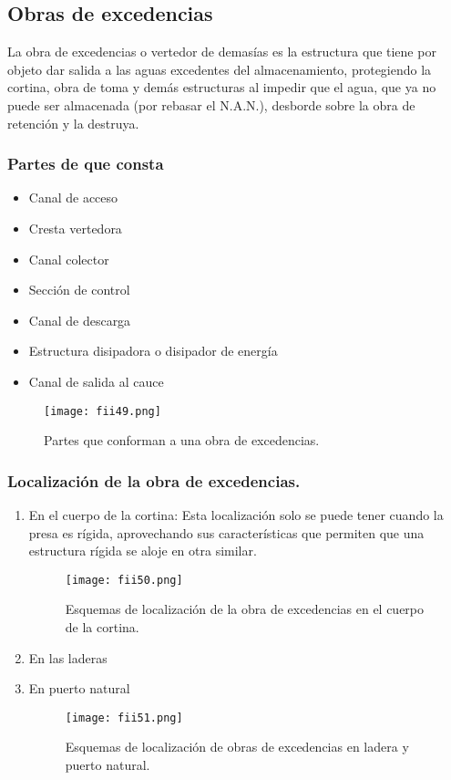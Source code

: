 \subsection{Obras de excedencias}

\begin{definition}
	La obra de excedencias o vertedor de demasías es la estructura que tiene por
	objeto dar salida a las aguas excedentes del almacenamiento, protegiendo la cortina,
	obra de toma y demás estructuras al impedir que el agua, que ya no puede ser
	almacenada (por rebasar el N.A.N.), desborde sobre la obra de retención y la destruya.
\end{definition}

\subsubsection{Partes de que consta}

\begin{itemize}
	\item Canal de acceso
	\item Cresta vertedora
	\item Canal colector
	\item Sección de control
	\item Canal de descarga
	\item Estructura disipadora o disipador de energía
	\item Canal de salida al cauce
\end{itemize}

\begin{figure}[h!]
	\centerline{\texttt{[image: fii49.png]}}
	\caption{Partes que conforman a una obra de excedencias.}
	\label{fii49}
\end{figure}

\subsubsection{Localización de la obra de excedencias.}

\begin{enumerate}[noitemsep]
	\item En el cuerpo de la cortina: Esta localización solo se puede tener cuando la presa es rígida, aprovechando
	      sus características que permiten que una estructura rígida se aloje en otra similar.
	      \begin{figure}[h!]
		      \centerline{\texttt{[image: fii50.png]}}
		      \caption{Esquemas de localización de la obra de excedencias en el cuerpo de la
			      cortina.}
		      \label{fii50}
	      \end{figure}
	\item En las laderas
	\item En puerto natural
	      \begin{figure}[h!]
		      \centerline{\texttt{[image: fii51.png]}}
		      \caption{Esquemas de localización de obras de excedencias en ladera y puerto
			      natural.}
		      \label{fii51}
	      \end{figure}
\end{enumerate}


